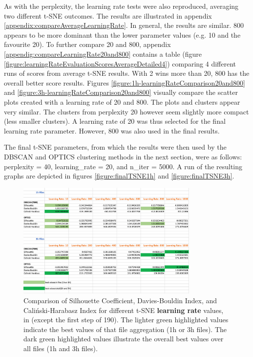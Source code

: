 As with the perplexity, the learning rate tests were also reproduced, averaging two different t-SNE outcomes. The results are illustrated in appendix \ref{appendix:compareAverageLearningRate}. In general, the results are similar. 800 appears to be more dominant than the lower parameter values (e.g. 10 and the favourite 20). To further compare 20 and 800, appendix \ref{appendig:compareLearningRate20and800} contains a table (figure \ref{figure:learningRateEvaluationScoresAverageDetailed4}) comparing 4 different runs of scores from average t-SNE results. With 2 wins more than 20, 800 has the overall better score results. Figures \ref{figure:1h-learningRateComparison20and800} and \ref{figure:3h-learningRateComparison20and800} visually compare the scatter plots created with a learning rate of 20 and 800. The plots and clusters appear very similar. The clusters from perplexity 20 however seem slightly more compact (less smaller clusters). A learning rate of 20 was thus selected for the final learning rate parameter. However, 800 was also used in the final results.


The final t-SNE parameters, from which the results were then used by the DBSCAN and OPTICS clustering methods in the next section, were as follows: perplexity = 40, learning\_rate = 20, and n\_iter = 5000. A run of the resulting graphs are depicted in figures \ref{figure:finalTSNE1h} and \ref{figure:finalTSNE3h}.


\begin{figure}
  \centering
  \includegraphics[width=0.8\textwidth]{./images/tsneParametersTest/learningRate/learningRateEvaluationScores.png}
  \caption{Comparison of Silhouette Coefficient, Davies-Bouldin Index, and Caliński-Harabasz Index for different t-SNE \textbf{learning rate} values, in  (except the first step of 190). The lighter green highlighted values indicate the best values of that file aggregation (1h or 3h files). The dark green highlighted values illustrate the overall best values over all files (1h and 3h files).}
  \label{figure:learningRateEvaluationScores}
\end{figure}


